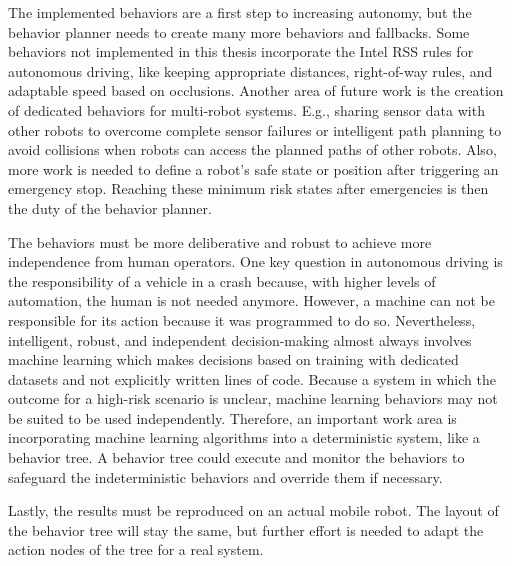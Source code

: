 The implemented behaviors are a first step to increasing autonomy, but the behavior planner needs to create many more behaviors and fallbacks. Some behaviors not implemented in this thesis incorporate the Intel RSS rules for autonomous driving, like keeping appropriate distances, right-of-way rules, and adaptable speed based on occlusions.
Another area of future work is the creation of dedicated behaviors for multi-robot systems. E.g., sharing sensor data with other robots to overcome complete sensor failures or intelligent path planning to avoid collisions when robots can access the planned paths of other robots. 
Also, more work is needed to define a robot's safe state or position after triggering an emergency stop. Reaching these minimum risk states after emergencies is then the duty of the behavior planner. 

The behaviors must be more deliberative and robust to achieve more independence from human operators. One key question in autonomous driving is the responsibility of a vehicle in a crash because, with higher levels of automation, the human is not needed anymore. However, a machine can not be responsible for its action because it was programmed to do so. Nevertheless, intelligent, robust, and independent decision-making almost always involves machine learning which makes decisions based on training with dedicated datasets and not explicitly written lines of code. Because a system in which the outcome for a high-risk scenario is unclear, machine learning behaviors may not be suited to be used independently. Therefore, an important work area is incorporating machine learning algorithms into a deterministic system, like a behavior tree. A behavior tree could execute and monitor the behaviors to safeguard the indeterministic behaviors and override them if necessary.

Lastly, the results must be reproduced on an actual mobile robot. The layout of the behavior tree will stay the same, but further effort is needed to adapt the action nodes of the tree for a real system. 
